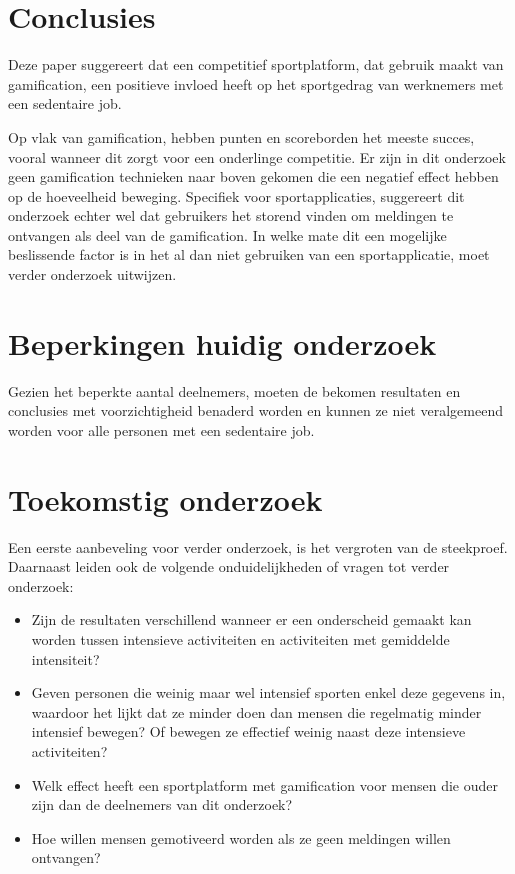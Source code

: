 \documentclass[a0,portrait]{hogent-poster}
\begin{document}
\begin{multicols}{2}
\section{Conclusies}

Deze paper suggereert dat een competitief sportplatform, dat gebruik maakt van
gamification, een positieve invloed heeft op het sportgedrag van werknemers met een sedentaire job.

Op vlak van gamification, hebben punten en scoreborden het meeste succes, vooral wanneer dit zorgt voor een onderlinge competitie. Er zijn in dit onderzoek geen gamification technieken naar boven gekomen die een negatief effect hebben op de hoeveelheid beweging. Specifiek voor sportapplicaties, suggereert dit onderzoek echter wel dat gebruikers het storend vinden om meldingen te ontvangen als deel van de gamification. In welke mate dit een mogelijke beslissende factor is in het al dan niet gebruiken van een sportapplicatie, moet verder onderzoek uitwijzen.

\section{Beperkingen huidig onderzoek}

Gezien het beperkte aantal deelnemers, moeten de bekomen resultaten en conclusies met voorzichtigheid benaderd worden en kunnen ze niet veralgemeend worden voor alle personen met een sedentaire job.

\section{Toekomstig onderzoek}

Een eerste aanbeveling voor verder onderzoek, is het vergroten van de
steekproef. Daarnaast leiden ook de volgende onduidelijkheden of vragen tot verder onderzoek:

\begin{itemize}
    \item Zijn de resultaten verschillend wanneer er een onderscheid gemaakt kan worden tussen intensieve activiteiten en activiteiten met gemiddelde intensiteit?
    \item Geven personen die weinig maar wel intensief sporten enkel deze gegevens in, waardoor het lijkt dat ze minder doen dan mensen die regelmatig minder intensief bewegen? Of bewegen ze effectief weinig naast deze intensieve activiteiten?
    \item Welk effect heeft een sportplatform met gamification voor mensen die ouder zijn dan de deelnemers van dit onderzoek?
    \item Hoe willen mensen gemotiveerd worden als ze geen meldingen willen ontvangen?
\end{itemize}


\end{multicols}
\end{document}
